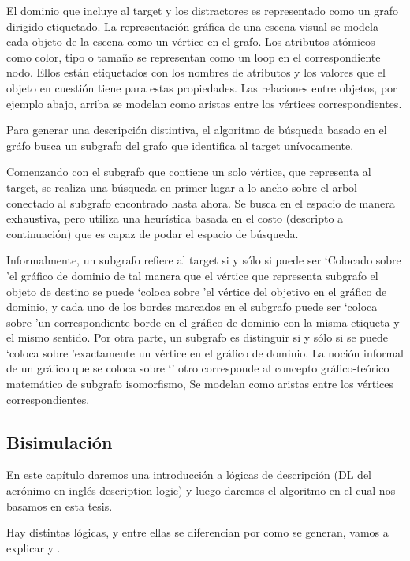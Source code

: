 El dominio que incluye al target y los distractores es representado como un grafo dirigido etiquetado. La representaci\'on gr\'afica de una escena visual se modela cada objeto de la escena como un v\'ertice en el grafo. Los atributos at\'omicos como color, tipo o tama\~no
se representan como un loop en el correspondiente nodo. Ellos est\'an etiquetados con los nombres de atributos y los valores que el objeto en cuesti\'on tiene para estas propiedades. Las relaciones entre objetos, por ejemplo abajo, arriba se modelan como aristas entre los v\'ertices correspondientes.

Para generar una descripci\'on distintiva, el algoritmo de b\'usqueda basado en el gr\'afo
busca un subgrafo del grafo que identifica al target un\'{i}vocamente.

Comenzando con el subgrafo que contiene un solo v\'ertice, que representa al target, se realiza una b\'usqueda en primer lugar a lo ancho sobre el arbol conectado al subgrafo encontrado hasta ahora. Se busca en el espacio de manera exhaustiva,
pero utiliza una heur\'{i}stica basada en el costo (descripto a continuaci\'on) que es capaz de podar el espacio de b\'usqueda.

Informalmente, un subgrafo refiere al target si y s\'olo si puede ser
`Colocado sobre 'el gr\'afico de dominio de tal manera que el v\'ertice que representa subgrafo
el objeto de destino se puede `coloca sobre 'el v\'ertice del objetivo en el gr\'afico de dominio,
y cada uno de los bordes marcados en el subgrafo puede ser `coloca sobre 'un correspondiente
borde en el gr\'afico de dominio con la misma etiqueta y el mismo sentido. Por otra parte,
un subgrafo es distinguir si y s\'olo si se puede `coloca sobre 'exactamente un
v\'ertice en el gr\'afico de dominio. La noci\'on informal de un gr\'afico que se coloca sobre `'
otro corresponde al concepto gr\'afico-te\'orico matem\'atico de
subgrafo isomorfismo, Se modelan como aristas entre los v\'ertices correspondientes.


\subsection{Bisimulaci\'on}


En este cap\'itulo daremos una introducci\'on a l\'ogicas de descripci\'on (DL del acr\'onimo en ingl\'es description logic) y luego daremos el algoritmo en el cual nos basamos en esta tesis.

Hay distintas l\'ogicas, y entre ellas se diferencian por como se generan, vamos a explicar \alc y \el.

